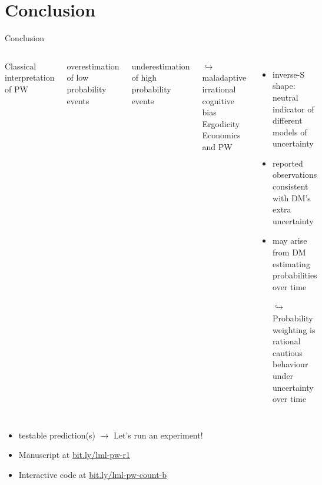 
\section{Conclusion}
\begin{frame}{Conclusion}
\begin{columns}[T]
Classical interpretation of PW
\bi
  \item overestimation of low probability events
  \item underestimation of high probability events
	\item[$\hookrightarrow$]	maladaptive irrational cognitive bias
\ei
{}
Ergodicity Economics and PW
\begin{itemize}
  \item inverse-S shape: neutral indicator of different models of uncertainty
	\item reported observations consistent with DM's extra uncertainty
	\item may arise from DM estimating probabilities over time
  \item[$\hookrightarrow$] Probability weighting is rational cautious behaviour under uncertainty over time
\end{itemize}
\end{columns}
\vfill
\begin{itemize}
  \item testable prediction(s) $\to$ Let's run an experiment!
  \item Manuscript at \url{bit.ly/lml-pw-r1}
  \item Interactive code at \url{bit.ly/lml-pw-count-b}    
\end{itemize}


\end{frame}
